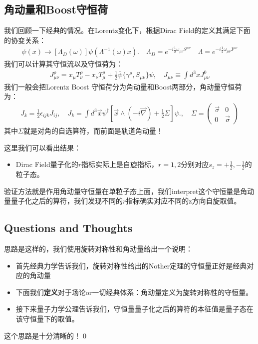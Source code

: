 \subsection{角动量和Boost守恒荷}


我们回顾一下经典的情况。在Lorentz变化下，根据Dirac Field的定义其满足下面的协变关系：
\begin{align}
  \psi(x)\to[\Lambda_D(\omega)]\psi(\Lambda^{-1}(\omega)x). \quad
  \Lambda_D=e^{-i\frac{1}{2}\omega_{\mu\nu}S^{\mu\nu}} \quad \Lambda
  = e^{-i\frac{1}{2}\omega_{\mu\nu}\mathrm{J}^{\mu\nu}}
\end{align}
我们可以计算其守恒流以及守恒荷为：
\begin{align}
  J_{\mu\nu}^\rho=x_\mu T_\nu^\rho-x_\nu
  T_\mu^\rho+\frac{1}{2}\bar{\psi}\{\gamma^\rho,S_{\mu\nu}\}\psi,
  \quad J_{\mu\nu}\equiv\int d^3x J_{\mu\nu}^0
\end{align}
我们一般会把Lorentz Boost 守恒荷分为角动量和Boost两部分，角动量守恒荷为：
\begin{align}
  J_k = \displaystyle\frac{1}{2} \epsilon_{ijk} J_{ij}, \quad J_k
  =\int
  d^3\vec{x}\psi^\dagger\left[\vec{x}\wedge(-i\vec{\nabla})+\frac{1}{2}
  \Sigma \right]\psi., \quad \Sigma =
  \begin{pmatrix}
    \vec{\sigma} & 0 \\ 0 & \vec{\sigma}
  \end{pmatrix}
\end{align}
其中$ \Sigma $就是对角的自选算符，而前面是轨道角动量！

\bigskip
{}

这里我们可以看出结果：
\begin{itemize}
  \item Dirac Field量子化的$ r $指标实际上是自旋指标，$ r = 1,2 $分别对应$ s_z =
    +\frac{1}{2},-\frac{1}{2} $的粒子态。
\end{itemize}
验证方法就是作用角动量守恒量在单粒子态上面，我们interpret这个守恒量是角动量量子化之后的算符，我们发现不同的$ r $指标确实对应不同的z方向自旋取值。

\subsection{Questions and Thoughts}

思路是这样的，我们使用旋转对称性和角动量给出一个说明：
\begin{itemize}
  \item 首先经典力学告诉我们，旋转对称性给出的Nother定理的守恒量正好是经典对应的角动量
  \item 下面我们\textbf{定义}对于场论or一切经典体系：角动量定义为旋转对称性的守恒量。
  \item 接下来量子力学公理告诉我们，守恒量量子化之后的算符的本征值是量子态在该守恒量下的取值。
\end{itemize}
这个思路是十分清晰的！\qed
